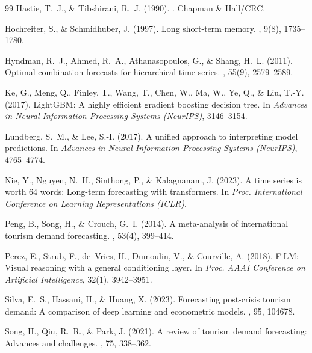 \documentclass[12pt,a4paper,oneside]{report}
\begin{document}
\begin{thebibliography}{99}
Hastie, T.~J., \& Tibshirani, R.~J. (1990).
.
\newblock Chapman \& Hall/CRC.

Hochreiter, S., \& Schmidhuber, J. (1997).
\newblock Long short-term memory.
, 9(8), 1735--1780.

Hyndman, R.~J., Ahmed, R.~A., Athanasopoulos, G., \& Shang, H.~L. (2011).
\newblock Optimal combination forecasts for hierarchical time series.
, 55(9), 2579--2589.

Ke, G., Meng, Q., Finley, T., Wang, T., Chen, W., Ma, W., Ye, Q., \& Liu, T.-Y. (2017).
\newblock LightGBM: A highly efficient gradient boosting decision tree.
\newblock In {\em Advances in Neural Information Processing Systems (NeurIPS)}, 3146--3154.

Lundberg, S.~M., \& Lee, S.-I. (2017).
\newblock A unified approach to interpreting model predictions.
\newblock In {\em Advances in Neural Information Processing Systems (NeurIPS)}, 4765--4774.

Nie, Y., Nguyen, N.~H., Sinthong, P., \& Kalagnanam, J. (2023).
\newblock A time series is worth 64 words: Long-term forecasting with transformers.
\newblock In {\em Proc. International Conference on Learning Representations (ICLR)}.

Peng, B., Song, H., \& Crouch, G.~I. (2014).
\newblock A meta-analysis of international tourism demand forecasting.
, 53(4), 399--414.

Perez, E., Strub, F., de~Vries, H., Dumoulin, V., \& Courville, A. (2018).
\newblock FiLM: Visual reasoning with a general conditioning layer.
\newblock In {\em Proc. AAAI Conference on Artificial Intelligence}, 32(1), 3942--3951.

Silva, E.~S., Hassani, H., \& Huang, X. (2023).
\newblock Forecasting post-crisis tourism demand: A comparison of deep learning and econometric models.
, 95, 104678.

Song, H., Qiu, R.~R., \& Park, J. (2021).
\newblock A review of tourism demand forecasting: Advances and challenges.
, 75, 338--362.


\end{thebibliography}
\end{document}

